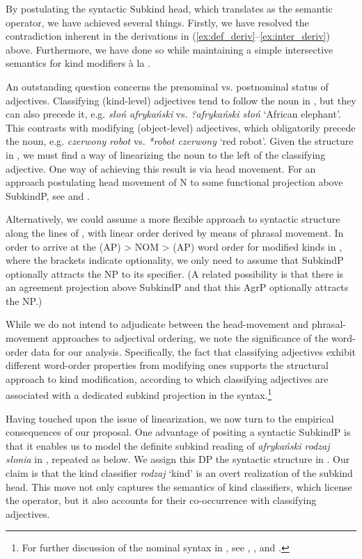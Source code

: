 \documentclass[output=paper]{langscibook}
\begin{document}
\noindent
By postulating the syntactic Subkind head, which translates as the semantic  operator, we have achieved several things. Firstly, we have resolved the contradiction inherent in the derivations in (\ref{ex:def_deriv}--\ref{ex:inter_deriv}) above. Furthermore, we have done so while maintaining a simple intersective semantics for kind modifiers à la \citet{McNally.Boleda2004}.

An outstanding question concerns the prenominal vs. postnominal status of  adjectives. Classifying (kind-level) adjectives tend to follow the noun in , but they can also precede it, e.g. \textit{słoń afrykański} vs. \textit{?afrykański słoń} `African elephant'. This contrasts with modifying (object-level) adjectives, which obligatorily precede the noun, e.g. \textit{czerwony robot} vs. \textit{*robot czerwony} `red robot'. Given the structure in , we must find a way of linearizing the noun to the left of the classifying adjective. One way of achieving this result is via head movement. For an approach postulating head movement of N to some functional projection above SubkindP, see \citet{Rutkowski.Progovac2005} and \citet{Rutkowski2012}.

Alternatively, we could assume a more flexible approach to syntactic structure along the lines of \citet{Cinque2005, Cinque2010}, with linear order derived by means of phrasal movement. In order to arrive at the (AP) > NOM > (AP) word order for modified kinds in , where the brackets indicate optionality, we only need to assume that SubkindP optionally attracts the NP to its specifier. (A related possibility is that there is an agreement projection above SubkindP and that this AgrP optionally attracts the NP.)

While we do not intend to adjudicate between the head-movement and phrasal-movement approaches to adjectival ordering, we note the significance of the word-order data for our analysis. Specifically, the fact that classifying adjectives exhibit different word-order properties from modifying ones supports the structural approach to kind modification, according to which classifying adjectives are associated with a dedicated subkind projection in the syntax.\footnote{For further discussion of the nominal syntax in , see \cite{Ceglowski2017}, \cite{Witkos.etal2018}, and \cite{Witkos.Dziubala.Szrejbrowska2018}.}

Having touched upon the issue of linearization, we now turn to the empirical consequences of our proposal. One advantage of positing a syntactic SubkindP is that it enables us to model the definite subkind reading of \textit{afrykański rodzaj słonia} in , repeated as  below. We assign this DP the syntactic structure in . Our claim is that the kind classifier \textit{rodzaj} `kind' is an overt realization of the subkind head. This move not only  captures the semantics of kind classifiers, which license the  operator, but it also accounts for their co-occurrence with classifying adjectives.
\end{document}
